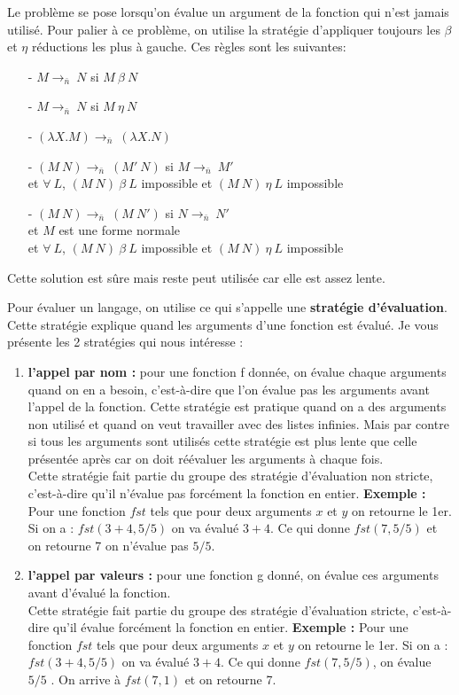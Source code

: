 \documentclass[10pt,a4paper]{report}
\begin{document}
Le problème se pose lorsqu'on évalue un argument de la fonction qui n'est jamais utilisé. Pour palier à ce problème, on utilise la stratégie d'appliquer toujours les $\beta$ et $\eta$ réductions les plus à gauche. Ces règles sont les suivantes:
\begin{itemize}
\item[-] $M \longrightarrow_{\bar{n}}~N$ si $M~\beta~N$
\item[-] $M \longrightarrow_{\bar{n}}~N$ si $M~\eta~N$
\item[-] $(\lambda X.M) \longrightarrow_{\bar{n}}~(\lambda X.N)$
\item[-] $(M~N) \longrightarrow_{\bar{n}}~(M'~N)$ si $M \longrightarrow_{\bar{n}}~M'$
  \\ et $\forall~L$, $(M~N)~\beta~L$ impossible et $(M~N)~\eta~L$ impossible
\item[-] $(M~N) \longrightarrow_{\bar{n}}~(M~N')$ si $N \longrightarrow_{\bar{n}}~N'$
  \\ et $M$ est une forme normale
  \\ et  $\forall~L$, $(M~N)~\beta~L$ impossible et $(M~N)~\eta~L$ impossible
\end{itemize}
\smallbreak
Cette solution est sûre mais reste peut utilisée car elle est assez lente.
\medbreak

Pour évaluer un langage, on utilise ce qui s'appelle une \textbf{stratégie d'évaluation}. Cette stratégie explique quand les arguments d'une fonction est évalué. Je vous présente les 2 stratégies qui nous intéresse :
\begin{enumerate}
\item \textbf{l'appel par nom :} pour une fonction f donnée, on évalue chaque arguments quand on en a besoin, c'est-à-dire que l'on évalue pas les arguments avant l'appel de la fonction. Cette stratégie est pratique quand on a des arguments non utilisé  et quand on veut travailler avec des listes infinies. Mais par contre si tous les arguments sont utilisés cette stratégie est plus lente que celle présentée après car on doit réévaluer les arguments à chaque fois. 
  \\Cette stratégie fait partie du groupe des stratégie d'évaluation non stricte, c'est-à-dire qu'il n'évalue pas forcément la fonction en entier. 
  \smallbreak
  \textbf{Exemple :} Pour une fonction $fst$ tels que pour deux arguments $x$ et $y$ on retourne le 1er. Si on a : $fst(3+4,5/5)$ on va évalué $3+4$. Ce qui donne $fst(7,5/5)$ et on retourne 7 on n'évalue pas $5/5$.
\item  \textbf{l'appel par valeurs :} pour une fonction g donné, on évalue ces arguments avant d'évalué la fonction.
  \\Cette stratégie fait partie du groupe des stratégie d'évaluation stricte, c'est-à-dire qu'il évalue forcément la fonction en entier.
  \smallbreak
  \textbf{Exemple :} Pour une fonction $fst$ tels que pour deux arguments $x$ et $y$ on retourne le 1er. Si on a : $fst(3+4,5/5)$ on va évalué $3+4$. Ce qui donne $fst(7,5/5)$, on évalue $5/5$ . On arrive à $fst(7,1)$ et on retourne 7.
\end{enumerate}
\medbreak
\end{document}
